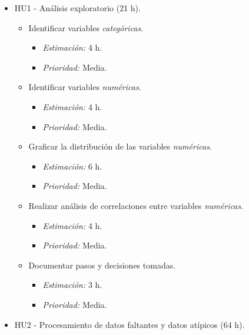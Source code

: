 \documentclass[
11pt, %
]{charter}
\begin{document}
\begin{itemize}
    \item HU1 - Análisis exploratorio (21 h).
        \begin{itemize}
            \item Identificar variables \textit{categóricas}.
                \begin{itemize}
                    \item \textit{Estimación:} 4 h.
                    \item \textit{Prioridad:} Media.
                \end{itemize}
            \item Identificar variables \textit{numéricas}.
                \begin{itemize}
                    \item \textit{Estimación:} 4 h.
                    \item \textit{Prioridad:} Media.
                \end{itemize}
            \item Graficar la distribución de las variables \textit{numéricas}.
                \begin{itemize}
                    \item \textit{Estimación:} 6 h.
                    \item \textit{Prioridad:} Media.
                \end{itemize}
            \item Realizar análisis de correlaciones entre variables \textit{numéricas}.
                \begin{itemize}
                    \item \textit{Estimación:} 4 h.
                    \item \textit{Prioridad:} Media.
                \end{itemize}
            \item Documentar pasos y decisiones tomadas.
                \begin{itemize}
                    \item \textit{Estimación:} 3 h.
                    \item \textit{Prioridad:} Media.
                \end{itemize}
        \end{itemize}
    \item HU2 - Procesamiento de datos faltantes y datos atípicos (64 h).
        \begin{itemize}

\end{itemize}
\end{itemize}
\end{document}
